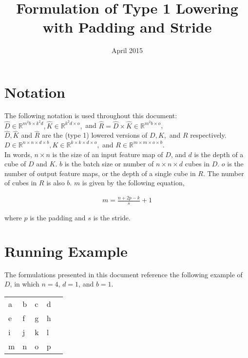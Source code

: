 \documentclass{article}
\title{Formulation of Type 1 Lowering with Padding and Stride}
\author{}
\date{April 2015}
\begin{document}
\maketitle

\section{Notation}

The following notation is used throughout this document:\\

$\widehat{D} \in \mathbb{R}^{m^2 b \times k^2 d}, \widehat{K} \in \mathbb{R}^{k^2 d \times o},$ and $\widehat{R} = \widehat{D} \times \widehat{K} \in \mathbb{R}^{m^2 b \times o}$,\\

$\widehat{D}, \widehat{K}$ and $\widehat{R}$ are the (type 1) lowered versions of $D, K, $ and $R$ respectively. $D \in \mathbb{R}^{n \times n \times d \times b}, K \in \mathbb{R}^{k \times k \times d \times o},$ and $R \in \mathbb{R}^{m \times m \times o \times b}$. \\

In words, $n \times n$ is the size of an input feature map of $D$, and $d$ is the depth of a cube of $D$ and $K$. $b$ is the batch size or number of $n \times n \times d$ cubes in $D$. $o$ is the number of output feature maps, or the depth of a single cube in $R$. The number of cubes in $R$ is also $b$. $m$ is given by the following equation,

\begin{equation} \label{eq_for_m}
\begin{split}
m = \frac{n + 2p - k}{s} + 1
\end{split}
\end{equation}

where $p$ is the padding and $s$ is the stride.

\section{Running Example}

The formulations presented in this document reference the following example of $D$, in which $n=4$, $d=1$, and $b=1$.

\begin{table}[h]
\centering
\begin{tabular}{lllll}
a & b & c & d  \\
e & f & g & h  \\
i & j & k & l  \\
m & n & o & p  
\end{tabular}
\end{table}
\end{document}
